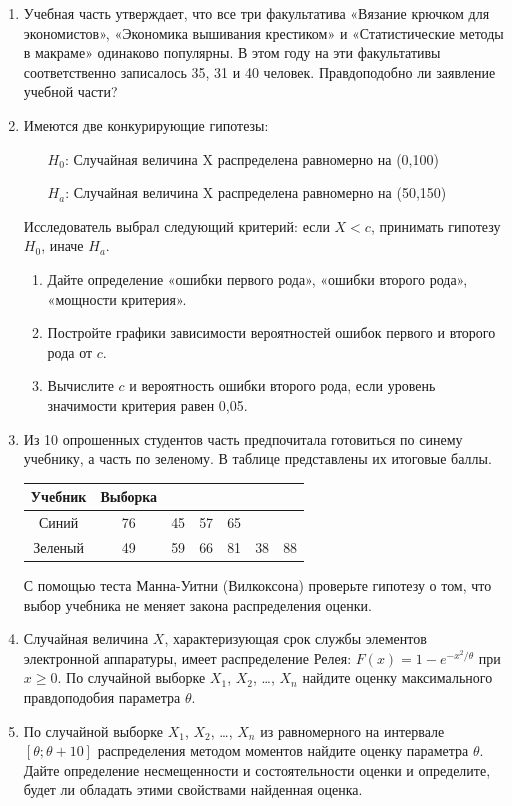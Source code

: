 \documentclass[12pt, a4paper]{article}\usepackage[]{graphicx}\usepackage[]{color}
\begin{document}
\begin{enumerate}
\begin{enumerate}
\end{enumerate}
\item Учебная часть утверждает, что все три факультатива «Вязание крючком для экономистов», «Экономика вышивания крестиком» и «Статистические методы в макраме» одинаково популярны. В этом году на эти факультативы соответственно записалось 35, 31 и 40 человек. Правдоподобно ли заявление учебной части?
\item Имеются две конкурирующие гипотезы:
\begin{enumerate}
\item[$H_0$:] Случайная величина X распределена равномерно на (0,100)
\item[$H_a$:] Случайная величина X распределена равномерно на (50,150)
\end{enumerate}
Исследователь выбрал следующий критерий: если $X<c$, принимать гипотезу $H_0$, иначе  $H_a$.
\begin{enumerate}
\item Дайте определение «ошибки первого рода», «ошибки второго рода», «мощности критерия».
\item Постройте графики зависимости вероятностей ошибок первого и второго рода от $c$.
\item Вычислите $c$ и вероятность ошибки второго рода, если уровень значимости критерия равен 0,05.
\end{enumerate}
\item Из 10 опрошенных студентов часть предпочитала готовиться по синему учебнику, а часть по зеленому. В таблице представлены их итоговые баллы.


\begin{tabular}{c|cccccc}
Учебник & Выборка &  &  &   &   &   \\
\hline
Синий & 76 & 45 & 57 & 65 &   &   \\
Зеленый & 49 & 59 & 66 & 81 & 38 & 88 \\
\end{tabular}


С помощью теста Манна-Уитни (Вилкоксона) проверьте гипотезу о том, что выбор учебника не меняет закона распределения оценки.

\item Случайная величина $X$, характеризующая срок службы элементов электронной аппаратуры, имеет распределение Релея: $F(x)=1-e^{-x^2/\theta}$ при $x\geq 0$. По случайной выборке $X_1$, $X_2$, \ldots, $X_n$ найдите оценку максимального правдоподобия параметра $\theta$.

\item По случайной выборке $X_1$, $X_2$, \ldots, $X_n$ из равномерного на интервале $[\theta;\theta+10]$ распределения методом моментов найдите оценку параметра $\theta$. Дайте определение несмещенности и состоятельности оценки и определите, будет ли обладать этими свойствами найденная оценка.


\end{enumerate}
\end{document}
